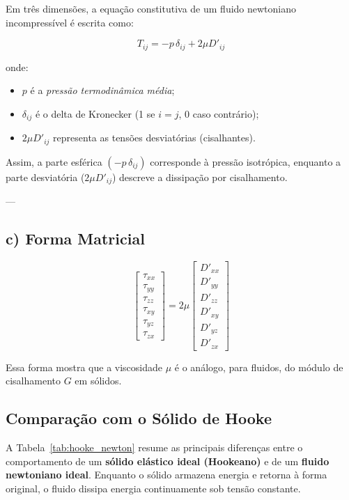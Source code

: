 Em três dimensões, a equação constitutiva de um fluido newtoniano incompressível é escrita como:

\[
T_{ij} = -p\,\delta_{ij} + 2\mu D'_{ij}
\]

onde:
\begin{itemize}
    \item $p$ é a \textit{pressão termodinâmica média};
    \item $\delta_{ij}$ é o delta de Kronecker (1 se $i=j$, 0 caso contrário);
    \item $2\mu D'_{ij}$ representa as tensões desviatórias (cisalhantes).
\end{itemize}

Assim, a parte esférica $(-p\,\delta_{ij})$ corresponde à pressão isotrópica, enquanto a parte desviatória ($2\mu D'_{ij}$) descreve a dissipação por cisalhamento.

---

\subsection*{c) Forma Matricial}

\begingroup
\setlength{\arraycolsep}{6pt}
\renewcommand{\arraystretch}{1.15}
\[
\begin{bmatrix}
\tau_{xx} \\[3pt]
\tau_{yy} \\[3pt]
\tau_{zz} \\[3pt]
\tau_{xy} \\[3pt]
\tau_{yz} \\[3pt]
\tau_{zx}
\end{bmatrix}
=
2\mu
\begin{bmatrix}
D'_{xx} \\[3pt]
D'_{yy} \\[3pt]
D'_{zz} \\[3pt]
D'_{xy} \\[3pt]
D'_{yz} \\[3pt]
D'_{zx}
\end{bmatrix}
\]
\endgroup

Essa forma mostra que a viscosidade $\mu$ é o análogo, para fluidos, do módulo de cisalhamento $G$ em sólidos.

\subsection{Comparação com o Sólido de Hooke}

A Tabela~\ref{tab:hooke_newton} resume as principais diferenças entre o comportamento de um \textbf{sólido elástico ideal (Hookeano)} e de um \textbf{fluido newtoniano ideal}.  
Enquanto o sólido armazena energia e retorna à forma original, o fluido dissipa energia continuamente sob tensão constante.

